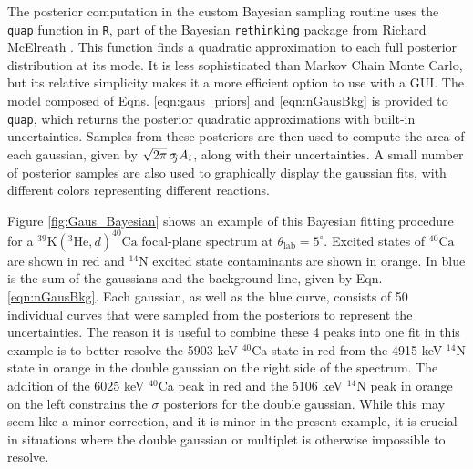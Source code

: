 The posterior computation in the custom Bayesian sampling routine uses the \texttt{quap} function in \texttt{R}, part of the Bayesian \texttt{rethinking} package from Richard McElreath \cite{McElreath2020}. This function finds a quadratic approximation to each full posterior distribution at its mode. It is less sophisticated than Markov Chain Monte Carlo, but its relative simplicity makes it a more efficient option to use with a GUI. The model composed of Eqns. \ref{eqn:gaus_priors} and \ref{eqn:nGausBkg} is provided to \texttt{quap}, which returns the posterior quadratic approximations with built-in uncertainties. Samples from these posteriors are then used to compute the area of each gaussian, given by $\sqrt{2\pi} \, \sigma_{\hspace{-0.08cm} j} A_{i}$, along with their uncertainties. A small number of posterior samples are also used to graphically display the gaussian fits, with different colors representing different reactions.

Figure \ref{fig:Gaus_Bayesian} shows an example of this Bayesian fitting procedure for a $^{39}\mathrm{K}(^{3}\mathrm{He},d)^{40}\mathrm{Ca}$ focal-plane spectrum at $\theta_{\mathrm{lab}} = 5^{\circ}$. Excited states of $^{40}\mathrm{Ca}$ are shown in red and $^{14}\mathrm{N}$ excited state contaminants are shown in orange. In blue is the sum of the gaussians and the background line, given by Eqn. \ref{eqn:nGausBkg}. Each gaussian, as well as the blue curve, consists of 50 individual curves that were sampled from the posteriors to represent the uncertainties. The reason it is useful to combine these 4 peaks into one fit in this example is to better resolve the 5903 keV $^{40}$Ca state in red from the 4915 keV $^{14}$N state in orange in the double gaussian on the right side of the spectrum. The addition of the 6025 keV $^{40}$Ca peak in red and the 5106 keV $^{14}$N peak in orange on the left constrains the $\sigma$ posteriors for the double gaussian. While this may seem like a minor correction, and it is minor in the present example, it is crucial in situations where the double gaussian or multiplet is otherwise impossible to resolve.

